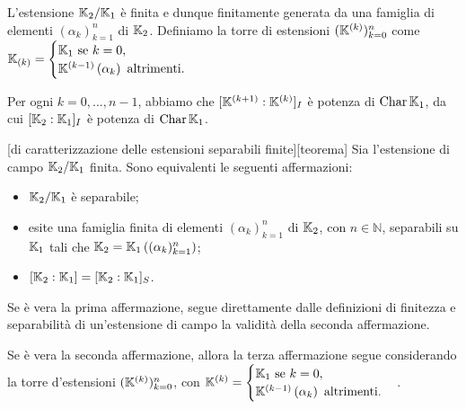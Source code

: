 \Proof L'estensione $\mathbb{K}_2/\mathbb{K}_1$ \`e finita e dunque finitamente generata da una famiglia di elementi $(\alpha_k)_{k = 1}^n$ di $\mathbb{K}_2$. Definiamo la torre di estensioni $(\mathbb{K}^{(k)})_{k = 0}^n$ come $\mathbb{K}_{(k)} = \begin{cases} \mathbb{K}_1\text{ se }k = 0,\\ \mathbb{K}^{(k - 1)} \left ( \alpha_k \right )\text{ altrimenti}.\end{cases}$
\par Per ogni $k = 0, ..., n - 1$, abbiamo che $[\mathbb{K}^{(k + 1)}:\mathbb{K}^{(k)}]_I$ \`e potenza di $\operatorname{Char}{\mathbb{K}_1}$, da cui $[\mathbb{K}_2:\mathbb{K}_1]_I$ \`e potenza di $\operatorname{Char}{\mathbb{K}_1}$. \EndProof
\begin{Theorem}
	[di caratterizzazione delle estensioni separabili finite][teorema] Sia l'estensione di campo $\mathbb{K}_2/\mathbb{K}_1$ finita. Sono equivalenti le seguenti affermazioni:
	\begin{itemize}
		\item $\mathbb{K}_2/\mathbb{K}_1$ \`e separabile;
		\item esite una famiglia finita di elementi $(\alpha_k)_{k = 1}^n$ di $\mathbb{K}_2$, con $n \in \mathbb{N}$, separabili su $\mathbb{K}_1$ tali che $\mathbb{K}_2 = \mathbb{K}_1 \left ( (\alpha_k)_{k = 1}^n \right )$;
		\item $[\mathbb{K}_2:\mathbb{K}_1] = [\mathbb{K}_2:\mathbb{K}_1]_S$.
	\end{itemize}
\end{Theorem}
\Proof Se \`e vera la prima affermazione, segue direttamente dalle definizioni di finitezza e separabilit\`a di un'estensione di campo la validit\`a della seconda affermazione.
\par Se \`e vera la seconda affermazione, allora la terza affermazione segue considerando la torre d'estensioni $(\mathbb{K}^{(k)})_{k = 0}^n$, con $\mathbb{K}^{(k)} = \begin{cases} \mathbb{K}_1\text{ se }k = 0,\\ \mathbb{K}^{(k - 1)} \left ( \alpha_k \right )\text{ altrimenti}.\end{cases}$.
